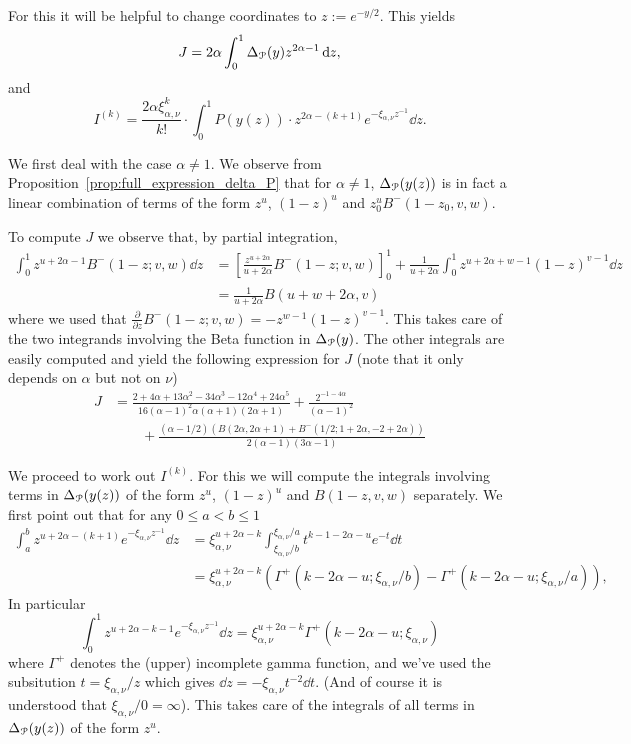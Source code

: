For this it will be helpful to change coordinates to $z := e^{-y/2}$. This yields 
\[ 
	J = 2 \alpha \int_0^1 \Delta_{{\mathcal P}}(y) z^{2\alpha-1} \operatorname{\mathrm{d}\hspace{-2pt}} z, 
\]
and 
\[ 
	I^{(k)} = \frac{2 \alpha \xi_{\alpha,\nu}^k}{k!} \cdot \int_0^1 P(y(z)) \cdot z^{2\alpha-(k+1)} e^{-\xi_{\alpha,\nu} z^{-1}} \dd z. 
\]


We first deal with the case $\alpha \not = 1$. We observe from Proposition~\ref{prop:full_expression_delta_P} that for $\alpha \not =1$, $\Delta_{{\mathcal P}}(y(z))$ is in fact a linear combination of terms of the form $z^u$, $(1-z)^u$ and $z_0^u B^-(1-z_0,v,w)$.

To compute $J$ we observe that, by partial integration, 
\begin{align*}
	\int_0^1 z^{u+2\alpha-1} B^-(1-z;v,w) \dd z 
	&= \left[ \frac{z^{u+2\alpha}}{u+2\alpha} B^-(1-z;v,w) \right]_0^1 
		+ \frac{1}{u+2\alpha} \int_0^1 z^{u+2\alpha+w-1} (1-z)^{v-1} \dd z \\
	&= \frac{1}{u+2\alpha} B(u+w+2\alpha,v)
\end{align*}
where we used that $\frac{\partial}{\partial z} B^-(1-z;v,w) = - z^{w-1} (1-z)^{v-1}$. This takes care of the two integrands involving the Beta function in $\Delta_{{\mathcal P}}(y)$. The other integrals are easily computed and yield the following expression for $J$ (note that it only depends on $\alpha$ but not on $\nu$)
\begin{align*}
J&=\frac{2 + 4 \alpha + 13 \alpha^2 - 34 \alpha^3 - 12\alpha^4 + 
	24 \alpha^5}{16(\alpha-1)^2 \alpha (\alpha+1) (2\alpha+1)} +  \frac{2^{-1 - 
		4 \alpha}}{(\alpha - 1)^2} \\
	&\qquad+ \frac{(\alpha - 1/2) (B(2 \alpha, 2 \alpha + 1) + 
	B^-(1/2; 1 + 2 \alpha, -2 + 2 \alpha))}{2 (\alpha - 1) (3 \alpha - 1)}
\end{align*}

We proceed to work out $I^{(k)}$. For this we will compute the integrals involving terms in $\Delta_{{\mathcal P}}(y(z))$ of the form $z^u$, $(1-z)^u$ and $B(1-z,v,w)$ separately. We first point out that for any $0 \le a < b \le 1$
\begin{align*}
	\int_a^b z^{u+2\alpha-(k+1)} e^{-\xi_{\alpha,\nu} z^{-1}} \dd z
	&= \xi_{\alpha,\nu}^{u+2\alpha-k} \int_{\xi_{\alpha,\nu}/b}^{\xi_{\alpha,\nu}/a} t^{k-1-2\alpha-u} e^{-t} \dd t \\
	&= \xi_{\alpha,\nu}^{u+2\alpha-k} \left( \Gamma^+( k-2\alpha-u;\xi_{\alpha,\nu}/b) - \Gamma^+( k-2\alpha-u; \xi_{\alpha,\nu}/a) \right), 
\end{align*}
In particular
\begin{equation}\label{eq:integral_Delta_P_z}
	\int_0^1 z^{u+2\alpha-k-1} e^{-\xi_{\alpha,\nu} z^{-1}} \dd z = \xi_{\alpha,\nu}^{u+2\alpha-k} \Gamma^+(k-2\alpha-u;\xi_{\alpha,\nu})
\end{equation}
where $\Gamma^+$ denotes the (upper) incomplete gamma function, and we've used the subsitution
$t = \xi_{\alpha,\nu} / z$ which gives $\dd z = -\xi_{\alpha, \nu} t^{-2} \dd t$. (And of course it is understood that 
$\xi_{\alpha,\nu}/0 = \infty$). This takes care of the integrals of all terms in $\Delta_{{\mathcal P}}(y(z))$ of the form $z^{u}$. 


